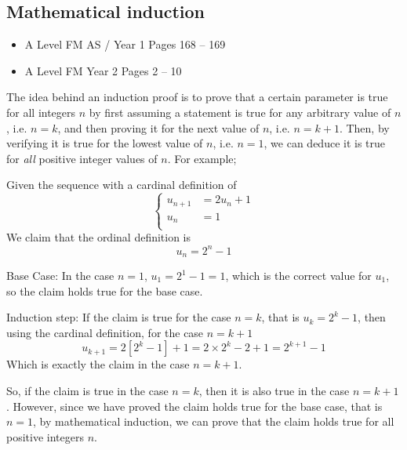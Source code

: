 \documentclass[11pt, a4paper]{article}
\begin{document}
\subsection{Mathematical induction}
\begin{itemize}
\item A Level FM AS / Year 1 \hspace{1cm} Pages 168 -- 169
\item A Level FM Year 2 \hspace{1cm} \phantom{AS /} Pages 2 -- 10
\end{itemize} \par
The idea behind an induction proof is to prove that a certain parameter is true for all integers $n$ by first assuming a statement is true for any arbitrary value of $n$, i.e. $n=k$, and then proving it for the next value of $n$, i.e. $n=k+1$. Then, by verifying it is true for the lowest value of $n$, i.e. $n=1$, we can deduce it is true for \emph{all} positive integer values of $n$. For example; \newline \par
Given the sequence with a cardinal definition of
\begin{equation*}
\begin{cases}
u_{n+1}&=2u_{n}+1\\
u_{n}&=1\\
\end{cases}
\end{equation*}
We claim that the ordinal definition is
\begin{equation*}
u_{n}=2^{n}-1
\end{equation*} \par
Base Case: In the case $n=1$, $u_{1}=2^{1}-1=1$, which is the correct value for $u_{1}$, so the claim holds true for the base case. \newline \par
Induction step: If the claim is true for the case $n=k$, that is $u_{k}=2^{k}-1$, then using the cardinal definition, for the case $n=k+1$
\begin{equation*}
u_{k+1}=2\left[ 2^{k}-1 \right]+1=2\times2^{k}-2+1=2^{k+1}-1
\end{equation*}
Which is exactly the claim in the case $n=k+1$. \newline \par
So, if the claim is true in the case $n=k$, then it is also true in the case $n=k+1$. However, since we have proved the claim holds true for the base case, that is $n=1$, by mathematical induction, we can prove that the claim holds true for all positive integers $n$.
\end{document}

